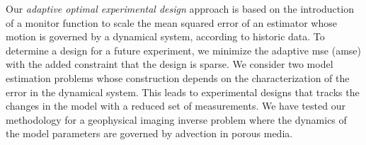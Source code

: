 \documentclass[11pt]{article}
\begin{document}
Our {\em adaptive optimal experimental design} approach is based on the introduction of a monitor function to scale the  mean squared error of an estimator whose motion is governed by a dynamical system, according to historic data. 
To determine a design for a future experiment, we minimize the adaptive mse (amse)  with the added constraint that the design is sparse. We consider two model estimation problems whose construction depends on the characterization of the error in the dynamical system. 
This leads to experimental designs that tracks the changes in the model with a reduced set of measurements.  
We have tested our methodology for a geophysical imaging inverse problem where the dynamics of the  model parameters are governed by advection in porous media. 

\bigskip

\newpage


%
\end{document}
